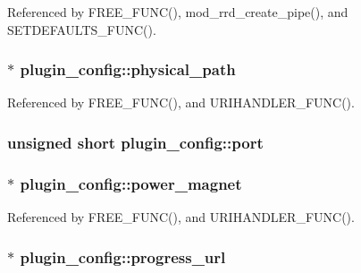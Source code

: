 Referenced by F\-R\-E\-E\-\_\-\-F\-U\-N\-C(), mod\-\_\-rrd\-\_\-create\-\_\-pipe(), and S\-E\-T\-D\-E\-F\-A\-U\-L\-T\-S\-\_\-\-F\-U\-N\-C().

\hypertarget{structplugin__config_a40ac262320060266b4bbc25bd8464162}{
\subsubsection[{physical\-\_\-path}]{$\ast$ plugin\-\_\-config\-::physical\-\_\-path}}\label{structplugin__config_a40ac262320060266b4bbc25bd8464162}


Referenced by F\-R\-E\-E\-\_\-\-F\-U\-N\-C(), and U\-R\-I\-H\-A\-N\-D\-L\-E\-R\-\_\-\-F\-U\-N\-C().

\hypertarget{structplugin__config_a72831c9fd738a5ecbe815642c6487358}{
\subsubsection[{port}]{\setlength{\rightskip}{0pt plus 5cm}unsigned short plugin\-\_\-config\-::port}}\label{structplugin__config_a72831c9fd738a5ecbe815642c6487358}
\hypertarget{structplugin__config_a592499e81ed0ec95452ac7d5bf8f3bd0}{
\subsubsection[{power\-\_\-magnet}]{$\ast$ plugin\-\_\-config\-::power\-\_\-magnet}}\label{structplugin__config_a592499e81ed0ec95452ac7d5bf8f3bd0}


Referenced by F\-R\-E\-E\-\_\-\-F\-U\-N\-C(), and U\-R\-I\-H\-A\-N\-D\-L\-E\-R\-\_\-\-F\-U\-N\-C().

\hypertarget{structplugin__config_a6260afa88f6d802feb2ccb3b7c729c9c}{
\subsubsection[{progress\-\_\-url}]{$\ast$ plugin\-\_\-config\-::progress\-\_\-url}}\label{structplugin__config_a6260afa88f6d802feb2ccb3b7c729c9c}


